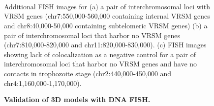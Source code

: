 \begin{figure}
  \begin{center}
   \\
   \\
  \hspace{0.015\textwidth}
  \\
  \end{center}
\caption{{\bf Validation of 3D models with DNA FISH.}}
{ Additional FISH images for (a) a pair of interchromosomal loci with VRSM
  genes (chr7:550,000-560,000 containing internal VRSM genes and
  chr8:40,000-50,000 containing subtelomeric VRSM genes)
  (b) a pair of interchromosomal loci that harbor no VRSM genes
  (chr7:810,000-820,000 and chr11:820,000-830,000).
  (c) FISH images showing lack of colocalization as a negative
  control for a pair of interchromosomal loci that harbor no VRSM genes
  and have no contacts in trophozoite stage (chr2:440,000-450,000 and chr4:1,160,000-1,170,000).
}
\label{suppfig:fish}
\end{figure}
\clearpage

